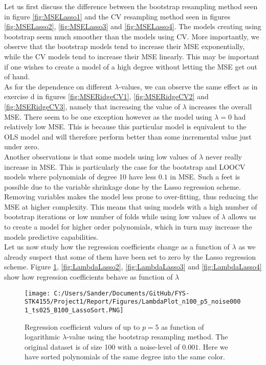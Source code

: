 \documentclass[12pt,a4paper]{article}
\begin{document}
\noindent Let us first discuss the difference between the bootstrap resampling method seen in figure \ref{fig:MSELasso1} and the CV resampling method seen in figures \ref{fig:MSELasso2}, \ref{fig:MSELasso3} and \ref{fig:MSELasso4}. The models creating using bootstrap seem much smoother than the models using CV. More importantly, we observe that the bootstrap models tend to increase their MSE exponentially, while the CV models tend to increase their MSE linearly. This may be important if one wishes to create a model of a high degree without letting the MSE get out of hand. 
\\
As for the dependence on different $\lambda$-values, we can observe the same effect as in exercise d in figures \ref{fig:MSERidgeCV1}, \ref{fig:MSERidgeCV2} and \ref{fig:MSERidgeCV3}, namely that increasing the value of $\lambda$ increases the overall MSE. There seem to be one exception however as the model using $\lambda = 0$ had relatively low MSE. This is because this particular model is equivalent to the OLS model and will therefore perform better than some incremental value just under zero. 
\\
Another observations is that some models using low values of $\lambda$ never really increase in MSE. This is particularly the case for the bootstrap and LOOCV models where polynomials of degree 10 have less $0.1$ in MSE. Such a feet is possible due to the variable shrinkage done by the Lasso regression scheme. Removing variables makes the model less prone to over-fitting, thus reducing the MSE at higher complexity. This means that using models with a high number of bootstrap iterations or low number of folds while using low values of $\lambda$ allows us to create a model for higher order polynomials, which in turn may increase the models predictive capabilities.
\\
Let us now study how the regression coefficients change as a function of $\lambda$ as we already suspect that some of them have been set to zero by the Lasso regression scheme. Figure \ref{fig:LambdaLasso1}, \ref{fig:LambdaLasso2}, \ref{fig:LambdaLasso3} and \ref{fig:LambdaLasso4} show how regression coefficients behave as function of $\lambda$

\begin{figure}[H]
\centering
\texttt{[image: C:/Users/Sander/Documents/GitHub/FYS-STK4155/Project1/Report/Figures/LambdaPlot\_n100\_p5\_noise0001\_ts025\_B100\_LassoSort.PNG]}
\caption{\label{fig:LambdaLasso1} Regression coefficient values of up to $p = 5$ as function of logarithmic $\lambda$-value using the bootstrap resampling method. The original dataset is of size 100 with a noise-level of $0.001$. Here we have sorted polynomials of the same degree into the same color.}
\end{figure}
\end{document}
